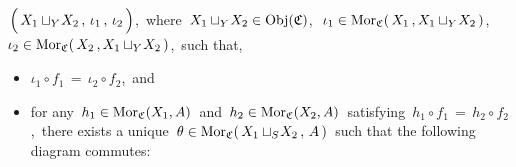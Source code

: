 \begin{definition}
\begin{enumerate}
	\,$\left(\,X_{1}\overset{{\color{white}.}}{\sqcup_{Y}}\!X_{2} \,,\, \iota_{1} \,,\, \iota_{2}\,\right)$,\,
	where
	\,$X_{1}\sqcup_{Y}\!X_{2} \in \textnormal{Obj}(\mathfrak{C})$,\,
	\,$\iota_{1} \in \textnormal{Mor}_{\mathfrak{C}}(\,X_{1}\,,X_{1}\sqcup_{Y}\!X_{2}\,)$,\,
	\,$\iota_{2} \in \textnormal{Mor}_{\mathfrak{C}}(\,X_{2}\,,X_{1}\sqcup_{Y}\!X_{2}\,)$,\,
	such that,
	\begin{itemize}
	\item
		$\iota_{1} \circ f_{1} \,=\, \iota_{2} \circ f_{2}$,\, and
	\item
		for any
		\,$h_{1} \in \textnormal{Mor}_{\mathfrak{C}}(X_{1},A)$\,
		and
		\,$h_{2} \in \textnormal{Mor}_{\mathfrak{C}}(X_{2},A)$\,
		satisfying
		\,$h_{1} \circ f_{1} \,=\, h_{2} \circ f_{2}$,\,
		there exists a unique
		\,$\theta \in \textnormal{Mor}_{\mathfrak{C}}(\,X_{1}\sqcup_{S}\!X_{2}\,,\,A\,)$\,
		such that the following diagram commutes:
		\begin{center}
		\end{center}
	\end{itemize}
\end{enumerate}
\end{definition}


